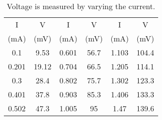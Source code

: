\begin{table}[H]
\centering
\caption{Voltage is measured by varying the current.}
\label{tabsi}
\begin{tabular}{|c|c||c|c||c|c|}
\hline
I    & V     & I    & V    & I     & V    \\        
(mA)    & (mV)     & (mA)    & (mV)     & (mA)     & (mV)      \\ \hline
0.1   & 9.53  & 0.601 & 56.7 & 1.103 & 104.4 \\ \hline
0.201 & 19.12 & 0.704 & 66.5 & 1.205 & 114.1 \\ \hline
0.3   & 28.4  & 0.802 & 75.7 & 1.302 & 123.3 \\ \hline
0.401 & 37.8  & 0.903 & 85.3 & 1.406 & 133.3 \\ \hline
0.502 & 47.3  & 1.005 & 95   & 1.47  & 139.6 \\ \hline
\end{tabular}
\end{table}